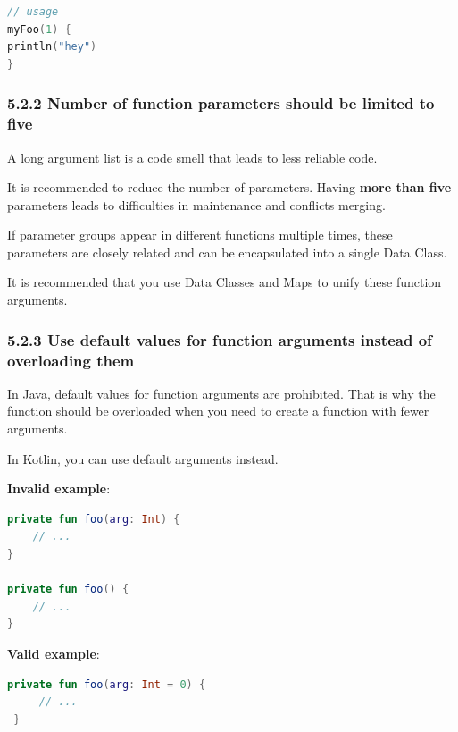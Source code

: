 {{{{\begin{lstlisting}[language=Kotlin]
// usage
myFoo(1) { 
println("hey")
}
\end{lstlisting}


\subsubsection*{\textbf{5.2.2 Number of function parameters should be limited to five}}
\leavevmode\newline

\label{sec:5.2.2}



A long argument list is a \href{https://en.wikipedia.org/wiki/Code_smell}{code smell} that leads to less reliable code.

It is recommended to reduce the number of parameters. Having \textbf{more than five} parameters leads to difficulties in maintenance and conflicts merging.

If parameter groups appear in different functions multiple times, these parameters are closely related and can be encapsulated into a single Data Class.

It is recommended that you use Data Classes and Maps to unify these function arguments.



\subsubsection*{\textbf{5.2.3 Use default values for function arguments instead of overloading them}}
\leavevmode\newline

\label{sec:5.2.3}

In Java, default values for function arguments are prohibited. That is why the function should be overloaded when you need to create a function with fewer arguments.

In Kotlin, you can use default arguments instead.



\textbf{Invalid example}:

\begin{lstlisting}[language=Kotlin]
private fun foo(arg: Int) {
    // ...
}

private fun foo() {
    // ...
}
\end{lstlisting}


\textbf{Valid example}:

\begin{lstlisting}[language=Kotlin]
 private fun foo(arg: Int = 0) {
     // ...
 }
\end{lstlisting}
}}}}
